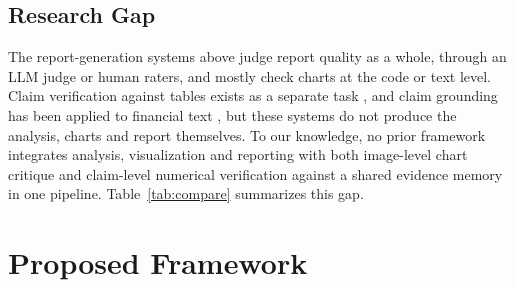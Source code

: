 \documentclass[conference]{IEEEtran}
\begin{document}
\subsection{Research Gap}
The report-generation systems above judge report quality as a whole, through an LLM judge or human raters, and mostly check charts at the code or text level. Claim verification against tables exists as a separate task \cite{mace2026}, and claim grounding has been applied to financial text \cite{verifyfin}, but these systems do not produce the analysis, charts and report themselves. To our knowledge, no prior framework integrates analysis, visualization and reporting with both image-level chart critique and claim-level numerical verification against a shared evidence memory in one pipeline. Table~\ref{tab:compare} summarizes this gap.

\begin{table}[t]
\centering
\caption{Feature comparison with representative systems}
\label{tab:compare}
\end{table}

\section{Proposed Framework}
\end{document}
